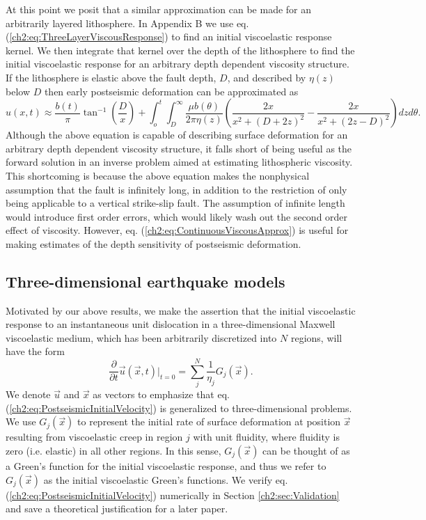 At this point we posit that a similar approximation can be made for an
arbitrarily layered lithosphere. In Appendix B we use
eq. (\ref{ch2:eq:ThreeLayerViscousResponse}) to find an initial viscoelastic
response kernel.  We then integrate that kernel over the depth of the
lithosphere to find the initial viscoelastic response for an arbitrary
depth dependent viscosity structure.  If the lithosphere is elastic
above the fault depth, $D$, and described by $\eta(z)$ below $D$ then
early postseismic deformation can be approximated as
\begin{equation}\label{ch2:eq:ContinuousViscousApprox}
u(x,t) \approx 
\frac{b(t)}{\pi}\tan^{-1}(\frac{D}{x}) + 
\int_o^t\int_D^\infty \frac{\mu b(\theta)}{2\pi\eta(z)}
                      \left(\frac{2x}{x^2 + \left(D + 2z\right)^2} - 
                      \frac{2x}{x^2 + \left(2z - D\right)^2}\right)
                      dz d\theta.
\end{equation}
Although the above equation is capable of describing surface
deformation for an arbitrary depth dependent viscosity structure, it
falls short of being useful as the forward solution in an inverse
problem aimed at estimating lithospheric viscosity.  This shortcoming
is because the above equation makes the nonphysical assumption that the
fault is infinitely long, in addition to the restriction of only being
applicable to a vertical strike-slip fault.  The assumption of
infinite length would introduce first order errors, which would likely
wash out the second order effect of viscosity. However,
eq. (\ref{ch2:eq:ContinuousViscousApprox}) is useful for making estimates of
the depth sensitivity of postseismic deformation.

\subsection{Three-dimensional earthquake models}\label{ch2:sec:3DModel}
Motivated by our above results, we make the assertion that the initial
viscoelastic response to an instantaneous unit dislocation in a
three-dimensional Maxwell viscoelastic medium, which has been
arbitrarily discretized into $N$ regions, will have the form
\begin{equation}\label{ch2:eq:PostseismicInitialVelocity}
\frac{\partial}{\partial t}\vec{u}(\vec{x},t)\big|_{t=0} = 
\sum_j^N\frac{1}{\eta_j}G_j(\vec{x}).
\end{equation}
We denote $\vec{u}$ and $\vec{x}$ as vectors to emphasize that eq.
(\ref{ch2:eq:PostseismicInitialVelocity}) is generalized to three-dimensional
problems.  We use $G_j(\vec{x})$ to represent the initial rate of
surface deformation at position $\vec{x}$ resulting from viscoelastic
creep in region $j$ with unit fluidity, where fluidity is zero (i.e.
elastic) in all other regions.  In this sense, $G_j(\vec{x})$ can be
thought of as a Green's function for the initial viscoelastic
response, and thus we refer to $G_j(\vec{x})$ as the initial
viscoelastic Green's functions.  We verify eq.
(\ref{ch2:eq:PostseismicInitialVelocity}) numerically in Section
\ref{ch2:sec:Validation} and save a theoretical justification for a later
paper.

